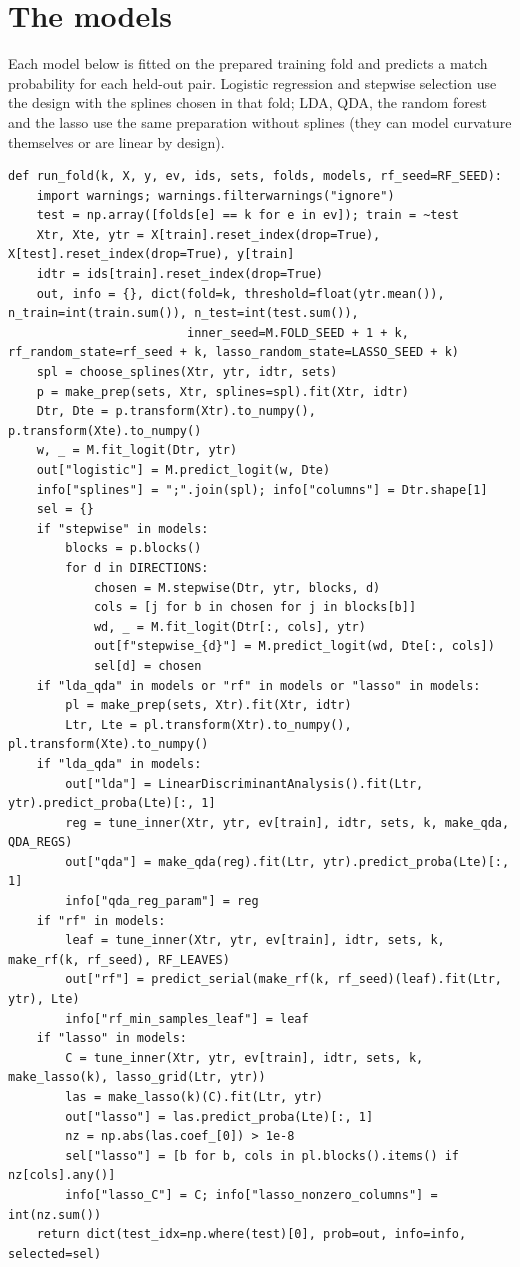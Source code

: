 \documentclass[11pt]{article}
\begin{document}
\section{The models}\label{sec:models}

Each model below is fitted on the prepared training fold and predicts a match probability for each held-out pair. Logistic regression and stepwise selection use the design with the splines chosen in that fold; LDA, QDA, the random forest and the lasso use the same preparation without splines (they can model curvature themselves or are linear by design).

\begin{lstlisting}[caption={One outer fold: preparation and every model (scripts/part1\_models.py)}]
def run_fold(k, X, y, ev, ids, sets, folds, models, rf_seed=RF_SEED):
    import warnings; warnings.filterwarnings("ignore")
    test = np.array([folds[e] == k for e in ev]); train = ~test
    Xtr, Xte, ytr = X[train].reset_index(drop=True), X[test].reset_index(drop=True), y[train]
    idtr = ids[train].reset_index(drop=True)
    out, info = {}, dict(fold=k, threshold=float(ytr.mean()), n_train=int(train.sum()), n_test=int(test.sum()),
                         inner_seed=M.FOLD_SEED + 1 + k, rf_random_state=rf_seed + k, lasso_random_state=LASSO_SEED + k)
    spl = choose_splines(Xtr, ytr, idtr, sets)
    p = make_prep(sets, Xtr, splines=spl).fit(Xtr, idtr)
    Dtr, Dte = p.transform(Xtr).to_numpy(), p.transform(Xte).to_numpy()
    w, _ = M.fit_logit(Dtr, ytr)
    out["logistic"] = M.predict_logit(w, Dte)
    info["splines"] = ";".join(spl); info["columns"] = Dtr.shape[1]
    sel = {}
    if "stepwise" in models:
        blocks = p.blocks()
        for d in DIRECTIONS:
            chosen = M.stepwise(Dtr, ytr, blocks, d)
            cols = [j for b in chosen for j in blocks[b]]
            wd, _ = M.fit_logit(Dtr[:, cols], ytr)
            out[f"stepwise_{d}"] = M.predict_logit(wd, Dte[:, cols])
            sel[d] = chosen
    if "lda_qda" in models or "rf" in models or "lasso" in models:
        pl = make_prep(sets, Xtr).fit(Xtr, idtr)
        Ltr, Lte = pl.transform(Xtr).to_numpy(), pl.transform(Xte).to_numpy()
    if "lda_qda" in models:
        out["lda"] = LinearDiscriminantAnalysis().fit(Ltr, ytr).predict_proba(Lte)[:, 1]
        reg = tune_inner(Xtr, ytr, ev[train], idtr, sets, k, make_qda, QDA_REGS)
        out["qda"] = make_qda(reg).fit(Ltr, ytr).predict_proba(Lte)[:, 1]
        info["qda_reg_param"] = reg
    if "rf" in models:
        leaf = tune_inner(Xtr, ytr, ev[train], idtr, sets, k, make_rf(k, rf_seed), RF_LEAVES)
        out["rf"] = predict_serial(make_rf(k, rf_seed)(leaf).fit(Ltr, ytr), Lte)
        info["rf_min_samples_leaf"] = leaf
    if "lasso" in models:
        C = tune_inner(Xtr, ytr, ev[train], idtr, sets, k, make_lasso(k), lasso_grid(Ltr, ytr))
        las = make_lasso(k)(C).fit(Ltr, ytr)
        out["lasso"] = las.predict_proba(Lte)[:, 1]
        nz = np.abs(las.coef_[0]) > 1e-8
        sel["lasso"] = [b for b, cols in pl.blocks().items() if nz[cols].any()]
        info["lasso_C"] = C; info["lasso_nonzero_columns"] = int(nz.sum())
    return dict(test_idx=np.where(test)[0], prob=out, info=info, selected=sel)
\end{lstlisting}
\end{document}
